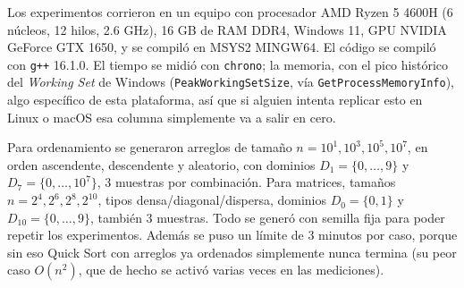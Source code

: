 Los experimentos corrieron en un equipo con procesador AMD Ryzen 5
4600H (6 núcleos, 12 hilos, 2.6 GHz), 16 GB de RAM DDR4, Windows 11, GPU NVIDIA GeForce GTX 1650, y se compiló en MSYS2 MINGW64.
El código se compiló con \texttt{g++} 16.1.0. El tiempo se midió con \texttt{chrono}; la memoria, con
el pico histórico del \textit{Working Set} de Windows
(\texttt{PeakWorkingSetSize}, vía \texttt{GetProcessMemoryInfo}), algo
específico de esta plataforma, así que si alguien intenta replicar
esto en Linux o macOS esa columna simplemente va a salir en cero.

Para ordenamiento se generaron arreglos de tamaño $n=10^1,10^3,10^5,10^7$,
en orden ascendente, descendente y aleatorio, con dominios $D_1=\{0,\dots,9\}$
y $D_7=\{0,\dots,10^7\}$, 3 muestras por combinación. Para matrices,
tamaños $n=2^4,2^6,2^8,2^{10}$, tipos densa/diagonal/dispersa, dominios
$D_0=\{0,1\}$ y $D_{10}=\{0,\dots,9\}$, también 3 muestras. Todo se
generó con semilla fija para poder repetir los experimentos. Además se
puso un límite de 3 minutos por caso, porque sin eso Quick Sort con
arreglos ya ordenados simplemente nunca termina (su peor caso
$O(n^2)$, que de hecho se activó varias veces en las mediciones).